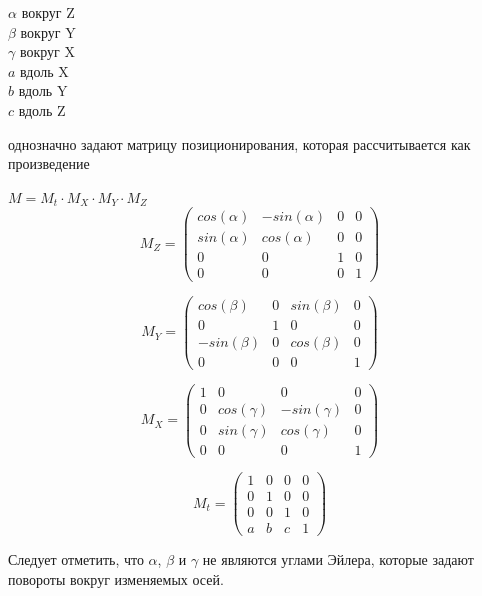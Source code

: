 {\centering
$\alpha$ вокруг Z \\
$\beta$ вокруг Y \\
$\gamma$ вокруг X \\
$a$ вдоль X \\
$b$ вдоль Y \\
$c$ вдоль Z \\
}

однозначно задают матрицу позиционирования, которая рассчитывается как произведение

{\centering
$M = M_t \cdot M_X \cdot M_Y \cdot M_Z$ \\

\[
M_Z=
\begin{pmatrix}
cos(\alpha) & -sin(\alpha) & 0 & 0 \\
sin(\alpha) & cos(\alpha) & 0 & 0 \\
0 & 0 & 1 & 0 \\
0 & 0 & 0 & 1
\end{pmatrix}
\]

\[
M_Y=
\begin{pmatrix}
cos(\beta) & 0 & sin(\beta) & 0 \\
0 & 1 & 0 & 0 \\
-sin(\beta) & 0 & cos(\beta) & 0 \\
0 & 0 & 0 & 1
\end{pmatrix}
\]

\[
M_X=
\begin{pmatrix}
1 & 0 & 0 & 0 \\
0 & cos(\gamma) & -sin(\gamma) & 0 \\
0 & sin(\gamma) & cos(\gamma) & 0  \\
0 & 0 & 0 & 1
\end{pmatrix}
\]

\[
M_t=
\begin{pmatrix}
1 & 0 & 0 & 0 \\
0 & 1 & 0 & 0 \\
0 & 0 & 1 & 0 \\
a & b & c & 1
\end{pmatrix}
\]

}

Следует отметить, что $\alpha$, $\beta$ и $\gamma$ не являются углами Эйлера, которые задают повороты вокруг изменяемых осей.

